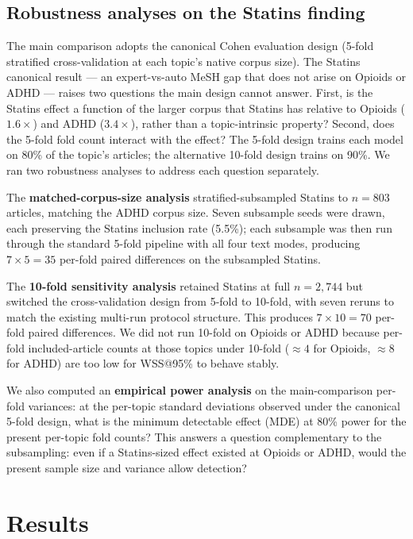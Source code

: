\documentclass{article}
\begin{document}
\subsection{Robustness analyses on the Statins finding}\label{sec:robustness}

The main comparison adopts the canonical Cohen evaluation design (5-fold stratified cross-validation at each topic's native corpus size). The Statins canonical result --- an expert-vs-auto MeSH gap that does not arise on Opioids or ADHD --- raises two questions the main design cannot answer. First, is the Statins effect a function of the larger corpus that Statins has relative to Opioids ($1.6\times$) and ADHD ($3.4\times$), rather than a topic-intrinsic property? Second, does the 5-fold fold count interact with the effect? The 5-fold design trains each model on 80\% of the topic's articles; the alternative 10-fold design trains on 90\%. We ran two robustness analyses to address each question separately.

The \textbf{matched-corpus-size analysis} stratified-subsampled Statins to $n=803$ articles, matching the ADHD corpus size. Seven subsample seeds were drawn, each preserving the Statins inclusion rate (5.5\%); each subsample was then run through the standard 5-fold pipeline with all four text modes, producing $7 \times 5 = 35$ per-fold paired differences on the subsampled Statins.

The \textbf{10-fold sensitivity analysis} retained Statins at full $n = 2{,}744$ but switched the cross-validation design from 5-fold to 10-fold, with seven reruns to match the existing multi-run protocol structure. This produces $7 \times 10 = 70$ per-fold paired differences. We did not run 10-fold on Opioids or ADHD because per-fold included-article counts at those topics under 10-fold ($\approx 4$ for Opioids, $\approx 8$ for ADHD) are too low for WSS@95\% to behave stably.

We also computed an \textbf{empirical power analysis} on the main-comparison per-fold variances: at the per-topic standard deviations observed under the canonical 5-fold design, what is the minimum detectable effect (MDE) at 80\% power for the present per-topic fold counts? This answers a question complementary to the subsampling: even if a Statins-sized effect existed at Opioids or ADHD, would the present sample size and variance allow detection?

\section{Results}
\end{document}
